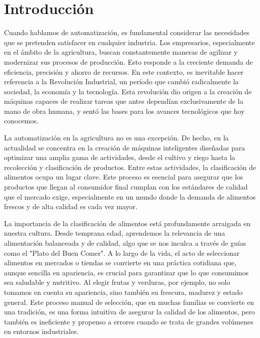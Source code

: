 \section{Introducción}

Cuando hablamos de automatización, es fundamental considerar las necesidades que se pretenden satisfacer en cualquier industria. Los empresarios, especialmente en el ámbito de la agricultura, buscan constantemente maneras de agilizar y modernizar sus procesos de producción. Esto responde a la creciente demanda de eficiencia, precisión y ahorro de recursos. En este contexto, es inevitable hacer referencia a la Revolución Industrial, un período que cambió radicalmente la sociedad, la economía y la tecnología. Esta revolución dio origen a la creación de máquinas capaces de realizar tareas que antes dependían exclusivamente de la mano de obra humana, y sentó las bases para los avances tecnológicos que hoy conocemos.

La automatización en la agricultura no es una excepción. De hecho, en la actualidad se concentra en la creación de máquinas inteligentes diseñadas para optimizar una amplia gama de actividades, desde el cultivo y riego hasta la recolección y clasificación de productos. Entre estas actividades, la clasificación de alimentos ocupa un lugar clave. Este proceso es esencial para asegurar que los productos que llegan al consumidor final cumplan con los estándares de calidad que el mercado exige, especialmente en un mundo donde la demanda de alimentos frescos y de alta calidad es cada vez mayor.

La importancia de la clasificación de alimentos está profundamente arraigada en nuestra cultura. Desde temprana edad, aprendemos la relevancia de una alimentación balanceada y de calidad, algo que se nos inculca a través de guías como el "Plato del Buen Comer". A lo largo de la vida, el acto de seleccionar alimentos en mercados o tiendas se convierte en una práctica cotidiana que, aunque sencilla en apariencia, es crucial para garantizar que lo que consumimos sea saludable y nutritivo. Al elegir frutas y verduras, por ejemplo, no solo tomamos en cuenta su apariencia, sino también su frescura, madurez y estado general. Este proceso manual de selección, que en muchas familias se convierte en una tradición, es una forma intuitiva de asegurar la calidad de los alimentos, pero también es ineficiente y propenso a errores cuando se trata de grandes volúmenes en entornos industriales.

